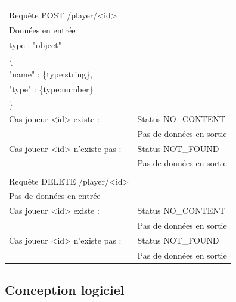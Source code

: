 \documentclass[12pt,a4paper]{article}
\begin{document}
\begin{longtable}{ll}
   & & \\
    
   Requête POST /player/<id> &  \\
   \hline
   \hline
   Données en entrée &  \\
   \hline
    type : "object" & \\
   \{ & \\
    \hspace{1cm} "name" : \{type:string\}, & \\
    \hspace{1cm} "type" : \{type:number\} & \\
   \} & \\
   \hline
   Cas joueur <id> existe : & Status NO\_CONTENT \\
   & Pas de données en sortie\\
   \hline
   Cas joueur <id> n'existe pas : & Status NOT\_FOUND \\
   & Pas de données en sortie\\

   & & \\
    
   Requête DELETE /player/<id> &  \\
   \hline
   \hline
   Pas de données en entrée &  \\
   \hline
   Cas joueur <id> existe : & Status NO\_CONTENT \\
   & Pas de données en sortie\\
   \hline
   Cas joueur <id> n'existe pas : & Status NOT\_FOUND \\
   & Pas de données en sortie\\

\end{longtable}

\subsection{Conception logiciel}
\end{document}
